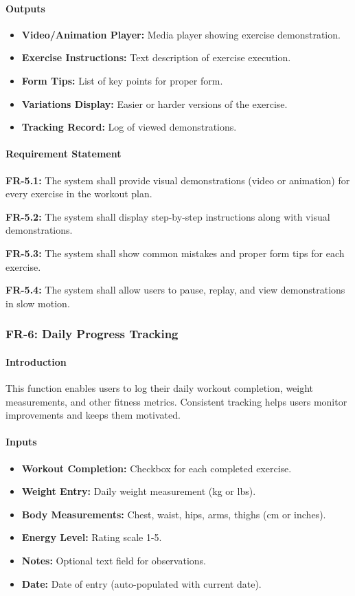 \documentclass[12pt,a4paper]{article}
\begin{document}
\paragraph{Outputs}
\begin{itemize}
    \item \textbf{Video/Animation Player:} Media player showing exercise demonstration.
    \item \textbf{Exercise Instructions:} Text description of exercise execution.
    \item \textbf{Form Tips:} List of key points for proper form.
    \item \textbf{Variations Display:} Easier or harder versions of the exercise.
    \item \textbf{Tracking Record:} Log of viewed demonstrations.
\end{itemize}

\paragraph{Requirement Statement}
\textbf{FR-5.1:} The system shall provide visual demonstrations (video or animation) for every exercise in the workout plan.

\textbf{FR-5.2:} The system shall display step-by-step instructions along with visual demonstrations.

\textbf{FR-5.3:} The system shall show common mistakes and proper form tips for each exercise.

\textbf{FR-5.4:} The system shall allow users to pause, replay, and view demonstrations in slow motion.

\subsubsection{FR-6: Daily Progress Tracking}

\paragraph{Introduction}
This function enables users to log their daily workout completion, weight measurements, and other fitness metrics. Consistent tracking helps users monitor improvements and keeps them motivated.

\paragraph{Inputs}
\begin{itemize}
    \item \textbf{Workout Completion:} Checkbox for each completed exercise.
    \item \textbf{Weight Entry:} Daily weight measurement (kg or lbs).
    \item \textbf{Body Measurements:} Chest, waist, hips, arms, thighs (cm or inches).
    \item \textbf{Energy Level:} Rating scale 1-5.
    \item \textbf{Notes:} Optional text field for observations.
    \item \textbf{Date:} Date of entry (auto-populated with current date).
\end{itemize}
\end{document}

